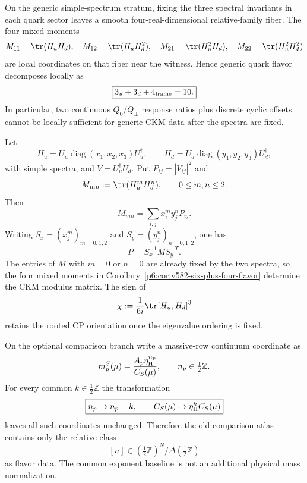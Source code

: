 \documentclass[12pt,a4paper]{article}
\newcommand{\etaH}{\eta_{\rm H}}
\begin{document}
\begin{corollary}
\label{p6:cor:v582-six-plus-four-flavor}
On the generic simple-spectrum stratum, fixing the three spectral invariants
in each quark sector leaves a smooth four-real-dimensional relative-family
fiber.  The four mixed moments
\[
 M_{11}=\tr(H_uH_d),\quad M_{12}=\tr(H_uH_d^2),\quad
 M_{21}=\tr(H_u^2H_d),\quad M_{22}=\tr(H_u^2H_d^2)
\]
are local coordinates on that fiber near the witness.  Hence generic quark
flavor decomposes locally as
\[
 \boxed{3_u+3_d+4_{\rm frame}=10.}
\]
In particular, two continuous $Q_0/Q_\perp$ response ratios plus discrete
cyclic offsets cannot be locally sufficient for generic CKM data after the
spectra are fixed.
\end{corollary}

\begin{proposition}
\label{p6:prop:v582-vandermonde-ckm-reconstruction}
Let
\[
 H_u=U_u\operatorname{diag}(x_1,x_2,x_3)U_u^\dagger,\qquad
 H_d=U_d\operatorname{diag}(y_1,y_2,y_3)U_d^\dagger,
\]
with simple spectra, and $V=U_u^\dagger U_d$.  Put
$P_{ij}=|V_{ij}|^2$ and
\[
 M_{mn}:=\tr(H_u^mH_d^n),\qquad 0\le m,n\le2.
\]
Then
\[
 M_{mn}=\sum_{i,j}x_i^m y_j^nP_{ij}.
\]
Writing $S_x=(x_j^m)_{m=0,1,2}$ and
$S_y=(y_j^n)_{n=0,1,2}$, one has
\[
 \boxed{P=S_x^{-1}MS_y^{-T}}.
\]
The entries of $M$ with $m=0$ or $n=0$ are already fixed by the two spectra,
so the four mixed moments in
Corollary~\ref{p6:cor:v582-six-plus-four-flavor} determine the CKM modulus
matrix.  The sign of
\[
 \chi:=\frac1{6i}\tr[H_u,H_d]^3
\]
retains the rooted CP orientation once the eigenvalue ordering is fixed.
\end{proposition}

\begin{theorem}
\label{p6:thm:v582-eta-g16-normalization-quotient}
On the optional comparison branch write a massive-row continuum coordinate as
\[
 m_p^S(\mu)=\frac{A_p\etaH^{n_p}}{C_S(\mu)},
 \qquad n_p\in\tfrac12\mathbb Z.
\]
For every common $k\in\tfrac12\mathbb Z$ the transformation
\[
 \boxed{n_p\mapsto n_p+k,\qquad C_S(\mu)\mapsto\etaH^kC_S(\mu)}
\]
leaves all such coordinates unchanged.  Therefore the old comparison atlas
contains only the relative class
\[
 [n]\in(\tfrac12\mathbb Z)^N/\Delta(\tfrac12\mathbb Z)
\]
as flavor data.  The common exponent baseline is not an additional physical
mass normalization.
\end{theorem}
\end{document}
